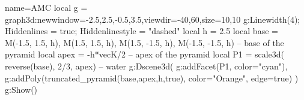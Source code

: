 \documentclass[12pt]{standalone}
\begin{document}
\begin{luadraw}{name=AMC}
local g = graph3d:new{window={-2.5,2.5,-0.5,3.5},viewdir={-40,60},size={10,10}}
g:Linewidth(4); Hiddenlines = true; Hiddenlinestyle = "dashed"
local h = 2.5
local base = {M(-1.5, 1.5, h), M(1.5, 1.5, h), M(1.5, -1.5, h), M(-1.5, -1.5, h)} -- base of the pyramid
local apex = -h*vecK/2 -- apex of the pyramid
local P1 = scale3d( reverse(base), 2/3, apex) -- water
g:Dscene3d(
    g:addFacet(P1, {color="cyan"}),
    g:addPoly(truncated_pyramid(base,apex,h,true), {color="Orange", edge=true})
)
g:Show()
\end{luadraw}
\end{document}
